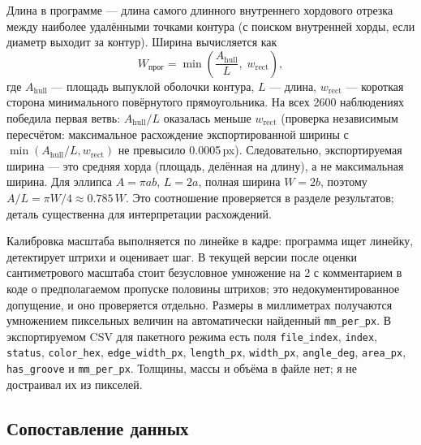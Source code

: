 \documentclass[12pt,a4paper]{article}
\begin{document}
Длина в программе — длина самого длинного внутреннего хордового отрезка
между наиболее удалёнными точками контура (с поиском внутренней хорды,
если диаметр выходит за контур). Ширина вычисляется как
\begin{equation}
W_{\text{прог}} = \min\!\left(\frac{A_{\text{hull}}}{L},\; w_{\text{rect}}\right),
\label{eq:width}
\end{equation}
где $A_{\text{hull}}$ — площадь выпуклой оболочки контура, $L$ — длина,
$w_{\text{rect}}$ — короткая сторона минимального повёрнутого
прямоугольника. На всех \num{2600} наблюдениях победила первая ветвь:
$A_{\text{hull}}/L$ оказалась меньше $w_{\text{rect}}$ (проверка
независимым пересчётом: максимальное расхождение экспортированной ширины
с $\min(A_{\text{hull}}/L, w_{\text{rect}})$ не превысило
\num{0.0005}\,px). Следовательно, экспортируемая ширина — это средняя
хорда (площадь, делённая на длину), а не максимальная ширина. Для
эллипса $A = \pi ab$, $L = 2a$, полная ширина $W = 2b$, поэтому
$A/L = \pi W/4 \approx \num{0.785}\,W$. Это соотношение проверяется в
разделе результатов; деталь существенна для интерпретации расхождений.

Калибровка масштаба выполняется по линейке в кадре: программа ищет
линейку, детектирует штрихи и оценивает шаг. В текущей версии после
оценки сантиметрового масштаба стоит безусловное умножение на 2 с
комментарием в коде о предполагаемом пропуске половины штрихов; это
недокументированное допущение, и оно проверяется отдельно. Размеры в
миллиметрах получаются умножением пиксельных величин на автоматически
найденный \texttt{mm\_per\_px}. В экспортируемом CSV для пакетного режима
есть поля \texttt{file\_index}, \texttt{index}, \texttt{status},
\texttt{color\_hex}, \texttt{edge\_width\_px}, \texttt{length\_px},
\texttt{width\_px}, \texttt{angle\_deg}, \texttt{area\_px},
\texttt{has\_groove} и \texttt{mm\_per\_px}. Толщины, массы и объёма в
файле нет; я не достраивал их из пикселей.

\subsection{Сопоставление данных}
\end{document}
